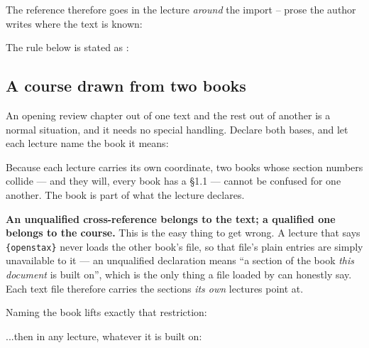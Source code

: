 The reference therefore goes in the lecture \emph{around} the import --
prose the author writes where the text is known:

\begin{manexsource}
The rule below is stated as :

\end{manexsource}

\subsection*{A course drawn from two books}

An opening review chapter out of one text and the rest out of another is
a normal situation, and it needs no special handling. Declare both bases,
and let each lecture name the book it means:

\begin{manexsource}
\end{manexsource}

\begin{manexsource}
\end{manexsource}

Because each lecture carries its own coordinate, two books whose section
numbers collide --- and they will, every book has a \S1.1 --- cannot be
confused for one another. The book is part of what the lecture declares.

\textbf{An unqualified cross-reference belongs to the text; a qualified
one belongs to the course.} This is the easy thing to get wrong. A lecture
that says \texttt{\{openstax\}} never loads the other book's
file, so that file's plain  entries are simply
unavailable to it --- an unqualified declaration means ``a section of the
book \emph{this document} is built on'', which is the only thing a file
loaded by  can honestly say. Each text file therefore carries
the sections \emph{its own} lectures point at.

Naming the book lifts exactly that restriction:

\begin{manexsource}
...then in any lecture, whatever it is built on:
\end{manexsource}

